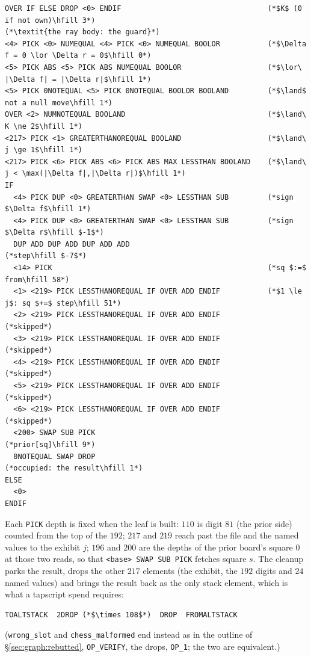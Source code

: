 \documentclass[11pt]{article}
\begin{document}
\begin{lstlisting}[style=script]
OVER IF ELSE DROP <0> ENDIF                                  (*$K$ (0 if not own)\hfill 3*)
(*\textit{the ray body: the guard}*)
<4> PICK <0> NUMEQUAL <4> PICK <0> NUMEQUAL BOOLOR           (*$\Delta f = 0 \lor \Delta r = 0$\hfill 0*)
<5> PICK ABS <5> PICK ABS NUMEQUAL BOOLOR                    (*$\lor\ |\Delta f| = |\Delta r|$\hfill 1*)
<5> PICK 0NOTEQUAL <5> PICK 0NOTEQUAL BOOLOR BOOLAND         (*$\land$ not a null move\hfill 1*)
OVER <2> NUMNOTEQUAL BOOLAND                                 (*$\land\ K \ne 2$\hfill 1*)
<217> PICK <1> GREATERTHANOREQUAL BOOLAND                    (*$\land\ j \ge 1$\hfill 1*)
<217> PICK <6> PICK ABS <6> PICK ABS MAX LESSTHAN BOOLAND    (*$\land\ j < \max(|\Delta f|,|\Delta r|)$\hfill 1*)
IF
  <4> PICK DUP <0> GREATERTHAN SWAP <0> LESSTHAN SUB         (*sign $\Delta f$\hfill 1*)
  <4> PICK DUP <0> GREATERTHAN SWAP <0> LESSTHAN SUB         (*sign $\Delta r$\hfill $-1$*)
  DUP ADD DUP ADD DUP ADD ADD                                (*step\hfill $-7$*)
  <14> PICK                                                  (*sq $:=$ from\hfill 58*)
  <1> <219> PICK LESSTHANOREQUAL IF OVER ADD ENDIF           (*$1 \le j$: sq $+=$ step\hfill 51*)
  <2> <219> PICK LESSTHANOREQUAL IF OVER ADD ENDIF           (*skipped*)
  <3> <219> PICK LESSTHANOREQUAL IF OVER ADD ENDIF           (*skipped*)
  <4> <219> PICK LESSTHANOREQUAL IF OVER ADD ENDIF           (*skipped*)
  <5> <219> PICK LESSTHANOREQUAL IF OVER ADD ENDIF           (*skipped*)
  <6> <219> PICK LESSTHANOREQUAL IF OVER ADD ENDIF           (*skipped*)
  <200> SWAP SUB PICK                                        (*prior[sq]\hfill 9*)
  0NOTEQUAL SWAP DROP                                        (*occupied: the result\hfill 1*)
ELSE
  <0>
ENDIF
\end{lstlisting}
Each \texttt{PICK} depth is fixed when the leaf is built: $110$ is
digit $81$ (the prior side) counted from the top of the $192$; $217$
and $219$ reach past the file and the named values to the exhibit
$j$; $196$ and $200$ are the depths of the prior board's square $0$
at those two reads, so that \texttt{<base> SWAP SUB PICK} fetches
square $s$. The cleanup parks the result, drops the other $217$
elements (the exhibit, the $192$ digits and $24$ named values) and
brings the result back as the only stack element, which is what a
tapscript spend requires:
\begin{lstlisting}[style=script]
TOALTSTACK  2DROP (*$\times 108$*)  DROP  FROMALTSTACK
\end{lstlisting}
(\texttt{wrong\_slot} and \texttt{chess\_malformed} end instead as in
the outline of \S\ref{sec:graph:rebutted}, \texttt{OP\_VERIFY}, the
drops, \texttt{OP\_1}; the two are equivalent.)
\end{document}
